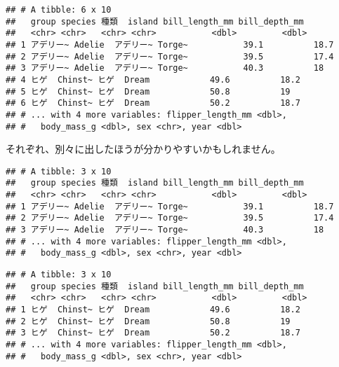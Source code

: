 \documentclass[
  xelatex,ja=standard, b5paper]{bxjsbook}
\newenvironment{Shaded}{\begin{snugshade}}{\end{snugshade}}
\newcommand{\CommentTok}[1]{\textcolor[rgb]{0.56,0.35,0.01}{\textit{#1}}}
\newcommand{\DataTypeTok}[1]{\textcolor[rgb]{0.13,0.29,0.53}{#1}}
\newcommand{\DecValTok}[1]{\textcolor[rgb]{0.00,0.00,0.81}{#1}}
\newcommand{\KeywordTok}[1]{\textcolor[rgb]{0.13,0.29,0.53}{\textbf{#1}}}
\newcommand{\NormalTok}[1]{#1}
\newcommand{\OperatorTok}[1]{\textcolor[rgb]{0.81,0.36,0.00}{\textbf{#1}}}
\newcommand{\StringTok}[1]{\textcolor[rgb]{0.31,0.60,0.02}{#1}}
\begin{document}
\begin{verbatim}
## # A tibble: 6 x 10
##   group species 種類  island bill_length_mm bill_depth_mm
##   <chr> <chr>   <chr> <chr>           <dbl>         <dbl>
## 1 アデリー~ Adelie  アデリー~ Torge~           39.1          18.7
## 2 アデリー~ Adelie  アデリー~ Torge~           39.5          17.4
## 3 アデリー~ Adelie  アデリー~ Torge~           40.3          18  
## 4 ヒゲ  Chinst~ ヒゲ  Dream            49.6          18.2
## 5 ヒゲ  Chinst~ ヒゲ  Dream            50.8          19  
## 6 ヒゲ  Chinst~ ヒゲ  Dream            50.2          18.7
## # ... with 4 more variables: flipper_length_mm <dbl>,
## #   body_mass_g <dbl>, sex <chr>, year <dbl>
\end{verbatim}

それぞれ、別々に出したほうが分かりやすいかもしれません。

\begin{Shaded}
\end{Shaded}

\begin{verbatim}
## # A tibble: 3 x 10
##   group species 種類  island bill_length_mm bill_depth_mm
##   <chr> <chr>   <chr> <chr>           <dbl>         <dbl>
## 1 アデリー~ Adelie  アデリー~ Torge~           39.1          18.7
## 2 アデリー~ Adelie  アデリー~ Torge~           39.5          17.4
## 3 アデリー~ Adelie  アデリー~ Torge~           40.3          18  
## # ... with 4 more variables: flipper_length_mm <dbl>,
## #   body_mass_g <dbl>, sex <chr>, year <dbl>
\end{verbatim}

\begin{Shaded}
\end{Shaded}

\begin{verbatim}
## # A tibble: 3 x 10
##   group species 種類  island bill_length_mm bill_depth_mm
##   <chr> <chr>   <chr> <chr>           <dbl>         <dbl>
## 1 ヒゲ  Chinst~ ヒゲ  Dream            49.6          18.2
## 2 ヒゲ  Chinst~ ヒゲ  Dream            50.8          19  
## 3 ヒゲ  Chinst~ ヒゲ  Dream            50.2          18.7
## # ... with 4 more variables: flipper_length_mm <dbl>,
## #   body_mass_g <dbl>, sex <chr>, year <dbl>
\end{verbatim}
\end{document}
